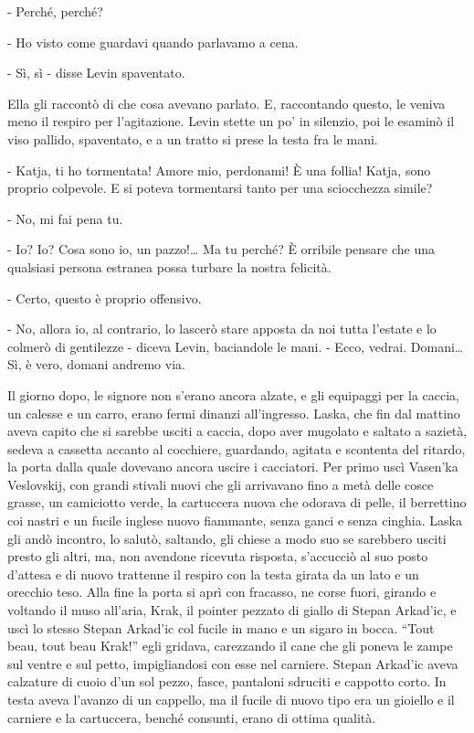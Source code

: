 - Perché, perché? 

- Ho visto come guardavi quando parlavamo a cena. 

- Sì, sì - disse Levin spaventato. 

Ella gli raccontò di che cosa avevano parlato. E, raccontando questo, le veniva meno il respiro per l'agitazione. Levin stette un po' in silenzio, poi le esaminò il viso pallido, spaventato, e a un tratto si prese la testa fra le mani. 

- Katja, ti ho tormentata! Amore mio, perdonami! È una follia! Katja, sono proprio colpevole. E si poteva tormentarsi tanto per una sciocchezza simile? 

- No, mi fai pena tu. 

- Io? Io? Cosa sono io, un pazzo!\ldots{} Ma tu perché? È orribile pensare che una qualsiasi persona estranea possa turbare la nostra felicità. 

- Certo, questo è proprio offensivo. 

- No, allora io, al contrario, lo lascerò stare apposta da noi tutta l'estate e lo colmerò di gentilezze - diceva Levin, baciandole le mani. - Ecco, vedrai. Domani\ldots{} Sì, è vero, domani andremo via. 

Il giorno dopo, le signore non s'erano ancora alzate, e gli equipaggi per la caccia, un calesse e un carro, erano fermi dinanzi all'ingresso. Laska, che fin dal mattino aveva capito che si sarebbe usciti a caccia, dopo aver mugolato e saltato a sazietà, sedeva a cassetta accanto al cocchiere, guardando, agitata e scontenta del ritardo, la porta dalla quale dovevano ancora uscire i cacciatori. Per primo uscì Vasen'ka Veslovskij, con grandi stivali nuovi che gli arrivavano fino a metà delle cosce grasse, un camiciotto verde, la cartuccera nuova che odorava di pelle, il berrettino coi nastri e un fucile inglese nuovo fiammante, senza ganci e senza cinghia. Laska gli andò incontro, lo salutò, saltando, gli chiese a modo suo se sarebbero usciti presto gli altri, ma, non avendone ricevuta risposta, s'accucciò al suo posto d'attesa e di nuovo trattenne il respiro con la testa girata da un lato e un orecchio teso. Alla fine la porta si aprì con fracasso, ne corse fuori, girando e voltando il muso all'aria, Krak, il pointer pezzato di giallo di Stepan Arkad'ic, e uscì lo stesso Stepan Arkad'ic col fucile in mano e un sigaro in bocca. ``Tout beau, tout beau Krak!'' egli gridava, carezzando il cane che gli poneva le zampe sul ventre e sul petto, impigliandosi con esse nel carniere. Stepan Arkad'ic aveva calzature di cuoio d'un sol pezzo, fasce, pantaloni sdruciti e cappotto corto. In testa aveva l'avanzo di un cappello, ma il fucile di nuovo tipo era un gioiello e il carniere e la cartuccera, benché consunti, erano di ottima qualità. 

